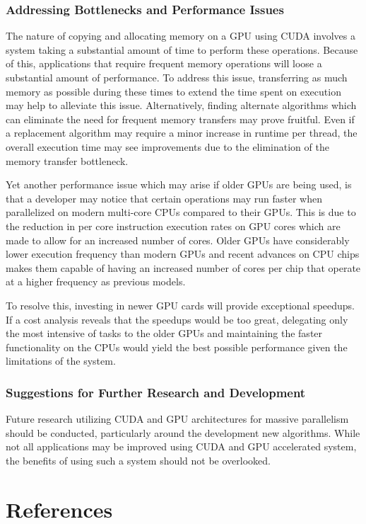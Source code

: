 \documentclass[11pt]{report}
\begin{document}
        \subsection{Addressing Bottlenecks and Performance Issues}
        The nature of copying and allocating memory on a GPU using CUDA involves a system taking a substantial amount of time to perform these operations. Because of this, applications that require frequent memory operations will loose a substantial amount of performance. To address this issue, transferring as much memory as possible during these times to extend the time spent on execution may help to alleviate this issue. Alternatively, finding alternate algorithms which can eliminate the need for frequent memory transfers may prove fruitful. Even if a replacement algorithm may require a minor increase in runtime per thread, the overall execution time may see improvements due to the elimination of the memory transfer bottleneck. 

        Yet another performance issue which may arise if older GPUs are being used, is that a developer may notice that certain operations may run faster when parallelized on modern multi-core CPUs compared to their GPUs. This is due to the reduction in per core instruction execution rates on GPU cores which are made to allow for an increased number of cores. Older GPUs have considerably lower execution frequency than modern GPUs and recent advances on CPU chips makes them capable of having an increased number of cores per chip that operate at a higher frequency as previous models. 
        
        To resolve this, investing in newer GPU cards will provide exceptional speedups. If a cost analysis reveals that the speedups would be too great, delegating only the most intensive of tasks to the older GPUs and maintaining the faster functionality on the CPUs would yield the best possible performance given the limitations of the system. 

        \subsection{Suggestions for Further Research and Development}
        Future research utilizing CUDA and GPU architectures for massive parallelism should be conducted, particularly around the development new algorithms. While not all applications may be improved using CUDA and GPU accelerated system, the benefits of using such a system should not be overlooked.


\newpage
\chapter{References}
\nocite{*}
\printbibliography[heading=bibintoc, heading=none]



    
\end{document}
